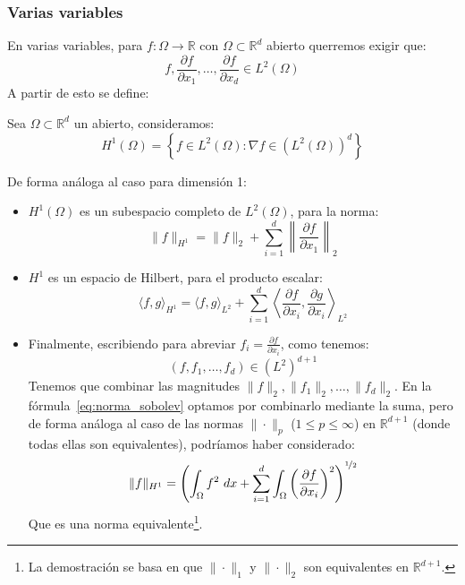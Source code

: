 \subsubsection{Varias variables}
\noindent
En varias variables, para $f:\Omega\to\mathbb{R}$ con $\Omega\subset\mathbb{R}^d$ abierto querremos exigir que:
\begin{equation*}
    f,\frac{\partial f}{\partial x_1},\ldots,\frac{\partial f}{\partial x_d}\in L^2(\Omega)
\end{equation*}
A partir de esto se define:

\begin{definicion}
    Sea $\Omega\subset\mathbb{R}^d$ un abierto, consideramos:
    \begin{equation*}
        H^1(\Omega) = \left\{f\in L^2(\Omega) : \nabla f \in (L^2(\Omega))^d\right\}
    \end{equation*}
\end{definicion}

\noindent
De forma análoga al caso para dimensión 1:
\begin{itemize}
    \item $H^1(\Omega)$ es un subespacio completo de $L^2(\Omega)$, para la norma:
        \begin{equation}\label{eq:norma_sobolev}
            \|f\|_{H^1} = \|f\|_2 + \sum_{i=1}^{d}\left\|\frac{\partial f}{\partial x_1}\right\|_2
        \end{equation}
    \item $H^1$ es un espacio de Hilbert, para el producto escalar:
        \begin{equation*}
            \langle f,g \rangle_{H^1} = \langle f,g \rangle_{L^2} + \sum_{i=1}^{d} \left\langle \frac{\partial f}{\partial x_i},\frac{\partial g}{\partial x_i} \right\rangle_{L^2}
        \end{equation*}
    \item Finalmente, escribiendo para abreviar $f_i = \frac{\partial f}{\partial x_i}$, como tenemos:
        \begin{equation*}
            (f,f_1,\ldots,f_d) \in {(L^2)}^{d+1}
        \end{equation*}
        Tenemos que combinar las magnitudes $\|f\|_2,\|f_1\|_2,\ldots,\|f_d\|_2$. En la fórmula~\eqref{eq:norma_sobolev} optamos por combinarlo mediante la suma, pero de forma análoga al caso de las normas $\|\cdot \|_p$ ($1\leq p\leq \infty$) en $\mathbb{R}^{d+1}$ (donde todas ellas son equivalentes), podríamos haber considerado:
        \begin{equation*}
            \|f\|_{H^1} = {\left(\int_\Omega f^2~dx + \sum_{i=1}^{d}\int_\Omega{\left(\frac{\partial f}{\partial x_i}\right)}^{2}\right)}^{\nicefrac{1}{2}}
        \end{equation*}
        Que es una norma equivalente\footnote{La demostración se basa en que $\|\cdot \|_1$ y $\|\cdot \|_2$ son equivalentes en $\mathbb{R}^{d+1}$.}.
\end{itemize}

